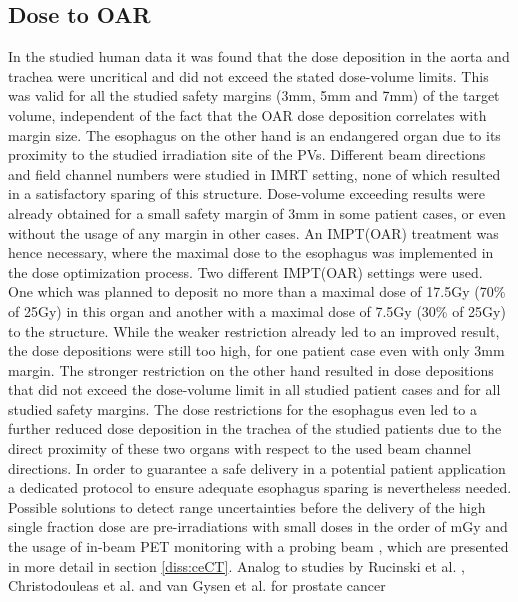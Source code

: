 \subsection{Dose to OAR}
\label{diss:Dose:OAR}
In the studied human data it was found that the dose deposition in the aorta and trachea were uncritical and did not exceed the 
stated dose-volume limits. This was valid for all the studied safety margins (3mm, 5mm and 7mm) of the target volume, independent of the fact 
that the OAR dose deposition correlates with margin size.
The esophagus on the other hand is an endangered organ due to its proximity to the studied irradiation site of the PVs. Different beam 
directions and field channel numbers were studied in IMRT setting, none of which resulted in a satisfactory sparing of this structure. 
Dose-volume exceeding results were already obtained for a small safety margin of 3mm in some patient cases, or even without the usage of 
any margin in other cases. An IMPT(OAR) treatment was hence necessary, where the maximal dose to the esophagus was implemented in the dose 
optimization process. Two different IMPT(OAR) settings were used. One which was planned to deposit no more than a maximal dose of 17.5Gy 
(70\% of 25Gy) in this organ and another with a maximal dose of 7.5Gy (30\% of 25Gy) to the structure. While the weaker restriction already led to 
an improved result, the dose depositions were still too high, for one patient case even with only 3mm margin. The stronger restriction on the 
other hand resulted in dose depositions that did not exceed the dose-volume limit in all studied patient cases and for all studied safety margins. 
The dose restrictions for the esophagus even led to a further reduced dose deposition in the trachea of the studied patients due to the 
direct proximity of these two organs with respect to the used beam channel directions.\newline
\newline
In order to guarantee a safe delivery in a potential patient application a dedicated protocol to ensure adequate esophagus sparing is 
nevertheless needed. Possible solutions to detect range uncertainties before the delivery of the high single fraction dose 
are pre-irradiations with small doses in the order of mGy \cite{Bent12} and the usage of in-beam PET monitoring with a probing beam 
\cite{Fie10, Lin12}, which are presented in more detail in section \ref{diss:ceCT}. 
Analog to studies by Rucinski et al. \cite{Ruc13}, Christodouleas et al. \cite{Chr13} and van Gysen et al. \cite{Gys14} for prostate cancer 
